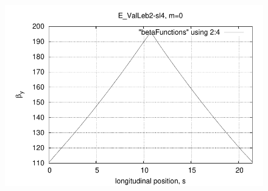\documentclass[t]{beamer}
\begin{document}
\begin{frame}{}
\begin{columns}
\begin{column}[t]{0.45\linewidth}
\begin{figure}[h]
\includegraphics[scale=0.48]{ETEAPOT_ValLeb2-sl4betay.pdf}
\end{figure}
\end{column}
\end{columns}
\end{frame}
\end{document}

